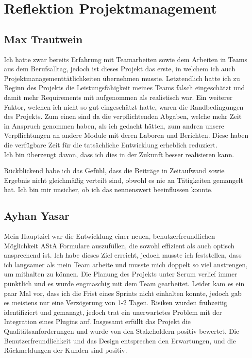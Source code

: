 \chapter{Reflektion Projektmanagement}\label{ch:reflektion-projektmanagement}


\section{Max Trautwein}

Ich hatte zwar bereits Erfahrung mit Teamarbeiten sowie dem Arbeiten in Teams aus dem Berufsalltag,
jedoch ist dieses Projekt das erste, in welchem ich auch Projektmanagementtätlichkeiten übernehmen musste.
Letztendlich hatte ich zu Beginn des Projekts die Leistungsfähigkeit meines Teams falsch eingeschätzt und
damit mehr Requirements mit aufgenommen als realistisch war.
Ein weiterer Faktor, welchen ich nicht so gut eingeschätzt hatte, waren die Randbedingungen des Projekts.
Zum einen sind da die verpflichtenden Abgaben, welche mehr Zeit in Anspruch genommen haben, als ich gedacht hätten,
zum andren unsere Verpflichtungen an andere Module mit deren Laboren und Berichten.
Diese haben die verfügbare Zeit für die tatsächliche Entwicklung erheblich reduziert.\\
Ich bin überzeugt davon, dass ich dies in der Zukunft besser realisieren kann.

Rückblickend habe ich das Gefühl, dass die Beiträge in Zeitaufwand sowie Ergebnis nicht gleichmäßig verteilt sind,
obwohl es nie an Tätigkeiten gemangelt hat.
Ich bin mir unsicher, ob ich das nennenswert beeinflussen konnte.

\section{Ayhan Yasar}
Mein Hauptziel war die Entwicklung einer neuen, benutzerfreundlichen Möglichkeit \ac{AStA} Formulare auszufüllen, die sowohl effizient als auch optisch ansprechend ist.
Ich habe dieses Ziel erreicht, jedoch musste ich feststellen, dass ich langsamer als mein Team arbeite und musste mich doppelt so viel anstrengen, um mithalten zu können.
Die Planung des Projekts unter Scrum verlief immer pünktlich und es wurde engmaschig mit dem Team gearbeitet. Leider kam es ein paar Mal vor, dass ich die Frist eines Sprints nicht einhalten konnte, 
jedoch gab es meistens nur eine Verzögerung von 1-2 Tagen. 
Risiken wurden frühzeitig identifiziert und gemanagt, jedoch trat ein unerwartetes Problem mit der Integration eines Plugins auf.
Insgesamt erfüllt das Projekt die Qualitätsanforderungen und wurde von den Stakeholdern positiv bewertet. Die Benutzerfreundlichkeit und das Design entsprechen den Erwartungen, und die Rückmeldungen der Kunden sind positiv.


